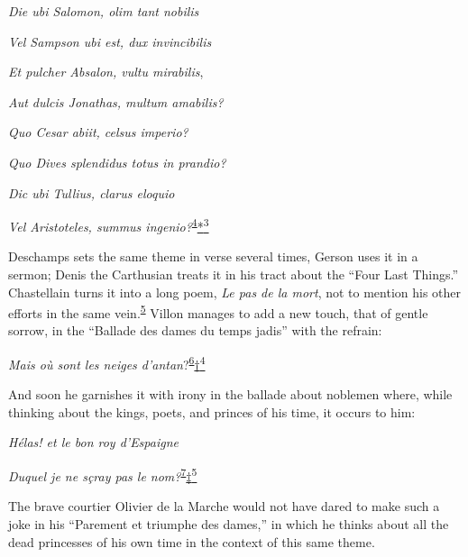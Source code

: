 \emph{Die ubi Salomon, olim tant nobilis}

\emph{Vel Sampson ubi est, dux invincibilis}

\emph{Et pulcher Absalon, vultu mirabilis},

\emph{Aut dulcis Jonathas, multum amabilis?}

\emph{Quo Cesar abiit, celsus imperio?}

\emph{Quo Dives splendidus totus in prandio?}

\emph{Dic ubi Tullius, clarus eloquio}

\emph{Vel Aristoteles, summus
ingenio?}\textsuperscript{\protect\hypertarget{12_Chapter_Five__THE_VISION_OF_DEAT.xhtmlux5cux23id_1343}{\protect\hyperlink{23_NOTES.xhtmlux5cux23id_1344}{4}}}\protect\hypertarget{12_Chapter_Five__THE_VISION_OF_DEAT.xhtmlux5cux23id_2953}{\protect\hyperlink{23_NOTES.xhtmlux5cux23id_2954}{*\textsuperscript{3}}}

Deschamps sets the same theme in verse several times, Gerson uses it in
a sermon; Denis the Carthusian treats it in his tract about the ``Four
Last Things.'' Chastellain turns it into a long poem, \emph{Le pas de la
mort}, not to mention his other efforts in the same
vein.\textsuperscript{\protect\hypertarget{12_Chapter_Five__THE_VISION_OF_DEAT.xhtmlux5cux23id_1341}{\protect\hyperlink{23_NOTES.xhtmlux5cux23id_1342}{5}}}
Villon manages to add a new touch, that of gentle sorrow, in the
``Ballade des dames du temps jadis'' with the refrain:

\emph{Mais où sont les neiges
d'antan}?\textsuperscript{\protect\hypertarget{12_Chapter_Five__THE_VISION_OF_DEAT.xhtmlux5cux23id_1339}{\protect\hyperlink{23_NOTES.xhtmlux5cux23id_1340}{6}}}\protect\hypertarget{12_Chapter_Five__THE_VISION_OF_DEAT.xhtmlux5cux23id_2957}{\protect\hyperlink{23_NOTES.xhtmlux5cux23id_2958}{†\textsuperscript{4}}}

And soon he garnishes it with irony in the ballade about noblemen where,
while thinking about the kings, poets, and princes of his time, it
occurs to him:

\emph{Hélas! et le bon roy d'Espaigne}

\emph{Duquel je ne sçray pas le
nom?}\textsuperscript{\protect\hypertarget{12_Chapter_Five__THE_VISION_OF_DEAT.xhtmlux5cux23id_1337}{\protect\hyperlink{23_NOTES.xhtmlux5cux23id_1338}{7}}}\protect\hypertarget{12_Chapter_Five__THE_VISION_OF_DEAT.xhtmlux5cux23id_2959}{\protect\hyperlink{23_NOTES.xhtmlux5cux23id_2960}{‡\textsuperscript{5}}}

The brave courtier Olivier de la Marche would not have dared to make
such a joke in his ``Parement et triumphe des dames,'' in
\protect\hypertarget{12_Chapter_Five__THE_VISION_OF_DEAT.xhtmlux5cux23page_159}{}{}which
he thinks about all the dead princesses of his own time in the context
of this same theme.

